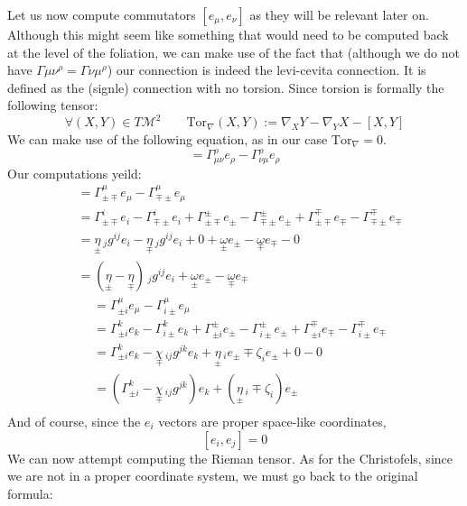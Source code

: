 \documentclass[a4paper,11pt]{article}
\numberwithin{equation}{section}
\theoremstyle{definition}
\begin{document}
Let us now compute commutators $[e_\mu,e_\nu]$ as they will be relevant later on. Although this might seem like something that would need to be computed back at the level of the foliation, we can make use of the fact that (although we do not have $\Gamma{\mu\nu}^\rho=\Gamma{\nu\mu}^\rho$) our connection is indeed the levi-cevita connection. It is defined as the (signle) connection with no torsion. Since torsion is formally the following tensor:
\begin{equation}
\forall (X,Y) \in T\mathcal{M}^2 \quad\quad  \mathrm{Tor}_\nabla(X,Y):= \nabla_XY-\nabla_YX-[X,Y]
\end{equation}
We can make use of the following equation, as in our case $\mathrm{Tor}_\nabla=0$.
\begin{equation}
    [e_\mu,e_\nu]=\Gamma_{\mu\nu}^\rho e_\rho-\Gamma_{\nu\mu}^\rho e_\rho
\end{equation}
Our computations yeild:
\begin{align*}
    [e_\pm,e_\mp]&=\Gamma_{\pm\mp}^\mu e_\mu - \Gamma_{\mp\pm}^\mu e_\mu\\
    &=\Gamma_{\pm\mp}^i e_i - \Gamma_{\mp\pm}^i e_i + \Gamma_{\pm\mp}^\pm e_\pm - \Gamma_{\mp\pm}^\pm e_\pm + \Gamma_{\pm\mp}^\mp e_\mp - \Gamma_{\mp\pm}^\mp e_\mp\\
    &=\underset{\pm}{\eta}\,_jg^{ij} e_i - \underset{\mp}{\eta}\,_jg^{ij} e_i + 0 + \underset{\pm}{\omega} e_\pm - \underset{\mp}{\omega} e_\mp - 0\\
    &=(\underset{\pm}{\eta}-\underset{\mp}{\eta})\,_jg^{ij} e_i+ \underset{\pm}{\omega} e_\pm - \underset{\mp}{\omega} e_\mp
\end{align*}
\begin{align*}
    [e_\pm,e_i]&=\Gamma_{\pm i}^\mu e_\mu - \Gamma_{i\pm}^\mu e_\mu\\
    &=\Gamma_{\pm i}^k e_k - \Gamma_{i\pm}^k e_k + \Gamma_{\pm i}^\pm e_\pm - \Gamma_{i\pm}^\pm e_\pm + \Gamma_{\pm i}^\mp e_\mp - \Gamma_{i\pm}^\mp e_\mp\\
    &=\Gamma_{\pm i}^k e_k - \underset{\mp}{\chi}\,_{ij}g^{jk} e_k + \underset{\pm}{\eta}\,_i e_\pm \mp \zeta_i e_\pm + 0 - 0\\
    &=(\Gamma_{\pm i}^k - \underset{\mp}{\chi}\,_{ij}g^{jk}) e_k + (\underset{\pm}{\eta}\,_i \mp \zeta_i) e_\pm\\
\end{align*}
And of course, since the $e_i$ vectors are proper space-like coordinates, 
$$[e_i,e_j]=0$$
We can now attempt computing the Rieman tensor. As for the Christofels, since we are not in a proper coordinate system, we must go back to the original formula:
\end{document}
